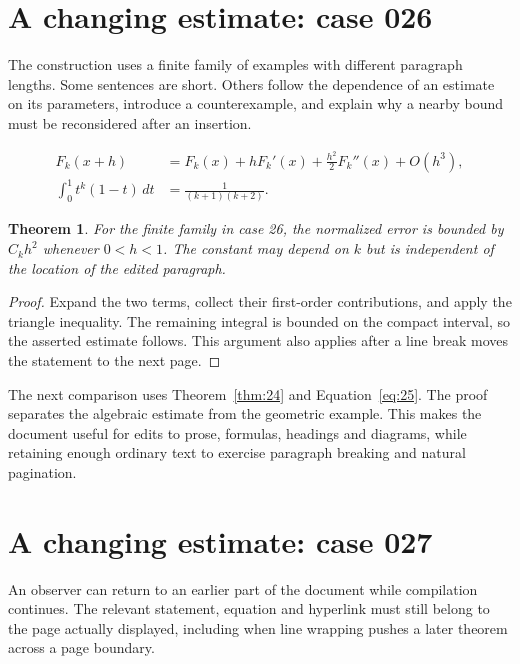 \documentclass[a4paper,10pt]{article}
\newtheorem{theorem}{Theorem}[section]
\begin{document}
\lipsum[23]

\section{A changing estimate: case 026}\label{unit:25}
The construction uses a finite family of examples with different paragraph lengths. Some sentences are short. Others follow the dependence of an estimate on its parameters, introduce a counterexample, and explain why a nearby bound must be reconsidered after an insertion.

\lipsum[16-17]
\begin{align}\label{eq:25}
 F_k(x+h)&=F_k(x)+hF_k'(x)+\frac{h^2}{2}F_k''(x)+O(h^3),\\
 \int_0^1 t^k(1-t)\,dt&=\frac{1}{(k+1)(k+2)}.
\end{align}
\begin{theorem}\label{thm:25}
For the finite family in case 26, the normalized error is bounded by $C_k h^2$ whenever $0<h<1$. The constant may depend on $k$ but is independent of the location of the edited paragraph.
\end{theorem}
\begin{proof}
Expand the two terms, collect their first-order contributions, and apply the
triangle inequality. The remaining integral is bounded on the compact interval,
so the asserted estimate follows. This argument also applies after a line break
moves the statement to the next page.
\end{proof}
The next comparison uses Theorem~\ref{thm:24} and Equation~\ref{eq:25}. The proof separates the algebraic estimate from the geometric example. This makes the document useful for edits to prose, formulas, headings and diagrams, while retaining enough ordinary text to exercise paragraph breaking and natural pagination.

\lipsum[3]

\section{A changing estimate: case 027}\label{unit:26}
An observer can return to an earlier part of the document while compilation continues. The relevant statement, equation and hyperlink must still belong to the page actually displayed, including when line wrapping pushes a later theorem across a page boundary.
\end{document}
